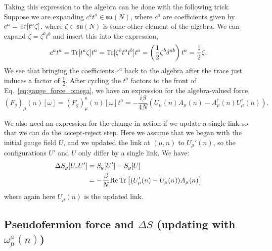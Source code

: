 Taking this expression to the algebra can be done with the following trick. Suppose we are expanding $c^a t^a\in\mathfrak{su}(N)$, where $c^a$ are coefficients given by $c^a = \mathrm{Tr} [ t^a \zeta]$, where $\zeta\in\mathfrak{su}(N)$ is some other element of the algebra. We can expand $\zeta = \zeta^b t^b$ and insert this into the expression,
\begin{equation}
	c^a t^a = \mathrm{Tr}[t^a \zeta] t^a = \mathrm{Tr} [\zeta^b t^a t^b] t^a = \left( \frac{1}{2} \zeta^b \delta^{ab}\right) t^a = \frac{1}{2} \zeta. 
\end{equation}
We see that bringing the coefficients $c^a$ back to the algebra after the trace just induces a factor of $\frac{1}{2}$. After cycling the $t^a$ factors to the front of Eq.~\eqref{eq:gauge_force_omega}, we have an expression for the algebra-valued force,
\begin{equation}
	(F_g)_\mu(n)[\omega] = (F_g)_\mu^a(n)[\omega] t^a = -\frac{i\beta}{4N} \left( U_\mu(n) A_\mu(n) - A_\mu^\dagger(n) U_\mu^\dagger(n) \right).
\end{equation}

We also need an expression for the change in action if we update a single link so that we can do the accept-reject step. Here we assume that we began with the initial gauge field $U$, and we updated the link at $(\mu, n)$ to $U_\mu'(n)$, so the configurations $U'$ and $U$ only differ by a single link. We have:
\begin{align}\begin{split}
	\Delta S_g[U, U'] &= S_g[U'] - S_g[U] \\
	&= -\frac{\beta}{N} \mathrm{Re} \,\mathrm{Tr} \left[ (U_\mu'(n) - U_\mu(n)) A_\mu(n) \right] 
\end{split}\end{align}
where again here $U_\mu(n)$ is the updated link. 

\subsection{Pseudofermion force and $\Delta S$  (updating with $\omega_\mu^a(n)$)}

